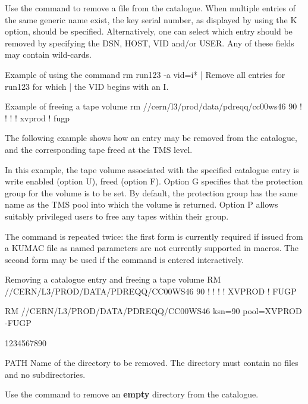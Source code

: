 Use the  command to remove a file from the catalogue. When multiple
entries of the same generic name exist, the key serial number, as
displayed by  using the K option, should be specified.
Alternatively, one can select which entry should be removed by
specifying the DSN, HOST, VID and/or USER. Any of these fields
may contain wild-cards. 
\begin{XMPt}{Example of using the \protect{} command}
rm run123 -a vid=i* | Remove all entries for run123 for which
                    | the VID begins with an I.
\end{XMPt}

\begin{XMPt}{Example of freeing a tape volume}
rm //cern/l3/prod/data/pdreqq/cc00ws46 90 ! ! ! ! xvprod ! fugp
\end{XMPt}

The following example shows how an entry may be removed from the
catalogue, and the corresponding tape freed at the TMS level.

In this example, the tape volume associated with the specified catalogue
entry is write enabled (option U), freed (option F). Option G specifies
that the protection group for the volume is to be set. By default, the
protection group has the same name as the TMS pool into which the
volume is returned. Option P allows suitably privileged users to
free any tapes within their group.

The command is repeated twice: the first form is currently required
if issued from a KUMAC file as named parameters are not currently
supported in macros. The second form may be used if the command is
entered interactively.

\begin{XMPt}{Removing a catalogue entry and freeing a tape volume}
RM //CERN/L3/PROD/DATA/PDREQQ/CC00WS46 90 ! ! ! ! XVPROD ! FUGP


RM //CERN/L3/PROD/DATA/PDREQQ/CC00WS46 ksn=90 pool=XVPROD -FUGP


\end{XMPt}

\begin{DLtt}{1234567890}
\item[PATH]Name of the directory to be removed. The directory must
contain no files and no subdirectories.
\end{DLtt}
Use the  command to remove an {\bf empty} 
directory from the catalogue.
 
